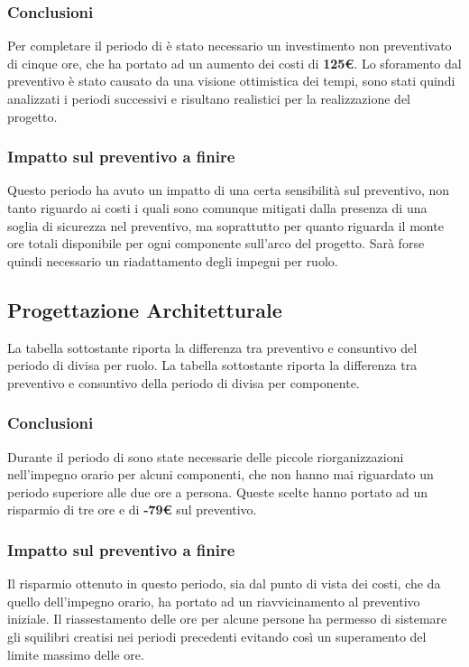 \subsubsection{Conclusioni}
Per completare il periodo di \AD{} è stato necessario un investimento non preventivato di cinque ore, che ha portato ad un aumento dei costi di \textbf{125€}. Lo sforamento dal preventivo è stato causato da una visione ottimistica dei tempi, sono stati quindi analizzati i periodi successivi e risultano realistici per la realizzazione del progetto.
\subsubsection{Impatto sul preventivo a finire}
Questo periodo ha avuto un impatto di una certa sensibilità sul preventivo, non tanto riguardo ai costi i quali sono comunque mitigati dalla presenza di una soglia di sicurezza nel preventivo, ma soprattutto per quanto riguarda il monte ore totali disponibile per ogni componente sull'arco del progetto. Sarà forse quindi necessario un riadattamento degli impegni per ruolo.

\subsection{Progettazione Architetturale}
La tabella sottostante riporta la differenza tra preventivo e consuntivo del periodo di \PA{} divisa per ruolo.
La tabella sottostante riporta la differenza tra preventivo e consuntivo della periodo di \PA{} divisa per componente.
\subsubsection{Conclusioni}
Durante il periodo di \PA{} sono state necessarie delle piccole riorganizzazioni nell'impegno orario per alcuni componenti, che non hanno mai riguardato un periodo superiore alle due ore a persona.
Queste scelte hanno portato ad un risparmio di tre ore e di \textbf{-79€} sul preventivo.
\subsubsection{Impatto sul preventivo a finire}
Il risparmio ottenuto in questo periodo, sia dal punto di vista dei costi, che da quello dell'impegno orario, ha portato ad un riavvicinamento al preventivo iniziale. Il riassestamento delle ore per alcune persone ha permesso di sistemare gli squilibri creatisi nei periodi precedenti evitando così un superamento del limite massimo delle ore.